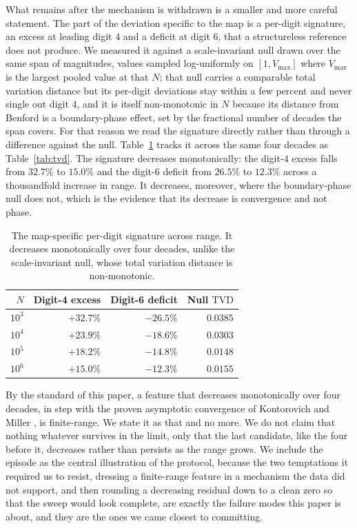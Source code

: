 \documentclass[11pt]{amsart}
\newcommand{\TVD}{\mathrm{TVD}}
\begin{document}
What remains after the mechanism is withdrawn is a smaller and more careful statement. The part of the deviation specific to the map is a per-digit signature, an excess at leading digit $4$ and a deficit at digit $6$, that a structureless reference does not produce. We measured it against a scale-invariant null drawn over the same span of magnitudes, values sampled log-uniformly on $[1, V_{\max}]$ where $V_{\max}$ is the largest pooled value at that $N$; that null carries a comparable total variation distance but its per-digit deviations stay within a few percent and never single out digit $4$, and it is itself non-monotonic in $N$ because its distance from Benford is a boundary-phase effect, set by the fractional number of decades the span covers. For that reason we read the signature directly rather than through a difference against the null. Table~\ref{tab:signature} tracks it across the same four decades as Table~\ref{tab:tvd}. The signature decreases monotonically: the digit-$4$ excess falls from $32.7\%$ to $15.0\%$ and the digit-$6$ deficit from $26.5\%$ to $12.3\%$ across a thousandfold increase in range. It decreases, moreover, where the boundary-phase null does not, which is the evidence that its decrease is convergence and not phase.

\begin{table}[ht]
\centering
\caption{The map-specific per-digit signature across range. It decreases monotonically over four decades, unlike the scale-invariant null, whose total variation distance is non-monotonic.}
\label{tab:signature}
\begin{tabular}{rrrr}
\toprule
$N$ & Digit-4 excess & Digit-6 deficit & Null $\TVD$ \\
\midrule
$10^3$ & $+32.7\%$ & $-26.5\%$ & $0.0385$ \\
$10^4$ & $+23.9\%$ & $-18.6\%$ & $0.0303$ \\
$10^5$ & $+18.2\%$ & $-14.8\%$ & $0.0148$ \\
$10^6$ & $+15.0\%$ & $-12.3\%$ & $0.0155$ \\
\bottomrule
\end{tabular}
\end{table}

By the standard of this paper, a feature that decreases monotonically over four decades, in step with the proven asymptotic convergence of Kontorovich and Miller \cite{km2005}, is finite-range. We state it as that and no more. We do not claim that nothing whatever survives in the limit, only that the last candidate, like the four before it, decreases rather than persists as the range grows. We include the episode as the central illustration of the protocol, because the two temptations it required us to resist, dressing a finite-range feature in a mechanism the data did not support, and then rounding a decreasing residual down to a clean zero so that the sweep would look complete, are exactly the failure modes this paper is about, and they are the ones we came closest to committing.
\end{document}
